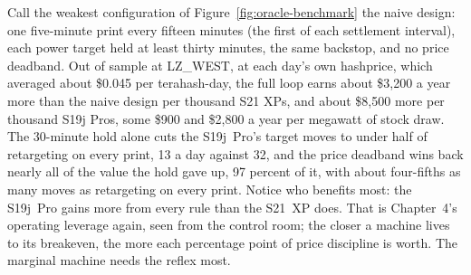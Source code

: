 Call the weakest configuration of Figure~\ref{fig:oracle-benchmark} the naive design: one five-minute print every fifteen minutes (the first of each settlement interval), each power target held at least thirty minutes, the same backstop, and no price deadband. Out of sample at LZ\_WEST, at each day's own hashprice, which averaged about \$0.045 per terahash-day, the full loop earns about \$3,200 a year more than the naive design per thousand S21 XPs, and about \$8,500 more per thousand S19j Pros, some \$900 and \$2,800 a year per megawatt of stock draw. The 30-minute hold alone cuts the S19j~Pro's target moves to under half of retargeting on every print, 13 a day against 32, and the price deadband wins back nearly all of the value the hold gave up, 97 percent of it, with about four-fifths as many moves as retargeting on every print. %
Notice who benefits most: the S19j~Pro gains more from every rule than the S21~XP does. That is Chapter~4's operating leverage again, seen from the control room; the closer a machine lives to its breakeven, the more each percentage point of price discipline is worth. The marginal machine needs the reflex most.

